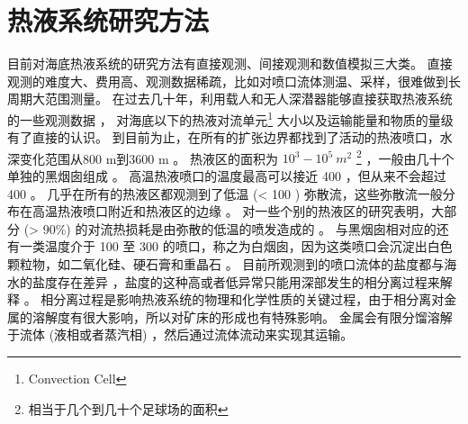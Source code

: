 \section{热液系统研究方法} 
目前对海底热液系统的研究方法有直接观测、间接观测和数值模拟三大类。
直接观测的难度大、费用高、观测数据稀疏，比如对喷口流体测温、采样，很难做到长周期大范围测量。
在过去几十年，利用载人和无人深潜器能够直接获取热液系统的一些观测数据 \citep{von2003extraordinary,charlou1996mineral} ，
对海底以下的热液对流单元\footnote{Convection Cell} 大小以及运输能量和物质的量级有了直接的认识。
到目前为止，在所有的扩张边界都找到了活动的热液喷口，水深变化范围从800 m到3600 m \citep{von2001edmond} 。
热液区的面积为  $ 10^3 - 10^5 \ m^2 $  \footnote{相当于几个到几十个足球场的面积} ，一般由几十个单独的黑烟囱组成 \citep{lowell1995seafloor} 。
高温热液喷口的温度最高可以接近 400 \ssd，但从来不会超过400 \ssd 。
几乎在所有的热液区都观测到了低温 (< 100 \ssd) 弥散流，这些弥散流一般分布在高温热液喷口附近和热液区的边缘 \citep{hannington1995physical} 。
对一些个别的热液区的研究表明，大部分 (> 90\%) 的对流热损耗是由弥散的低温的喷发造成的 \citep{lowell1995seafloor} 。
与黑烟囱相对应的还有一类温度介于 100 \ssd 至 300 \ssd 的喷口，称之为白烟囱，因为这类喷口会沉淀出白色颗粒物，如二氧化硅、硬石膏和重晶石 \citep{hannington1995physical} 。
目前所观测到的喷口流体的盐度都与海水的盐度存在差异 \citep{von2003extraordinary} ，盐度的这种高或者低异常只能用深部发生的相分离过程来解释 \citep{coumou2008numerical} 。
相分离过程是影响热液系统的物理和化学性质的关键过程，由于相分离对金属的溶解度有很大影响，所以对矿床的形成也有特殊影响。
金属会有限分馏溶解于流体 (液相或者蒸汽相) ，然后通过流体流动来实现其运输。

